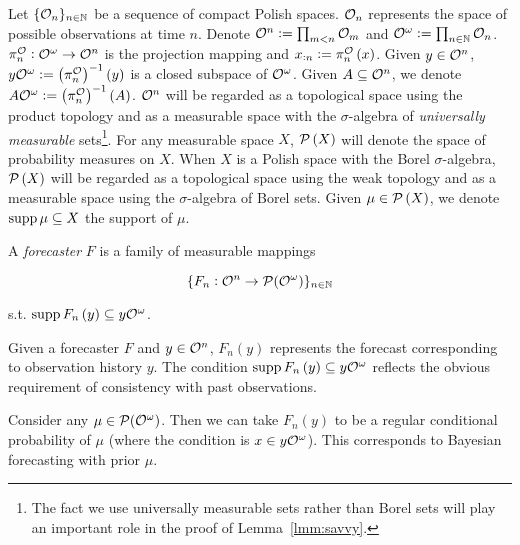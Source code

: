 Let $\{\mathcal{O}_n\}_{n \in \mathbb{N}}$ be a sequence of compact Polish spaces. $\mathcal{O}_n$ represents the space of possible observations at time $n$. Denote $\mathcal{O}^n := \prod_{m < n} \mathcal{O}_m$  and $\mathcal{O}^\omega:=\prod_{n \in \mathbb{N}} \mathcal{O}_n$. $\pi^{\mathcal{O}}_n: \mathcal{O}^\omega \rightarrow \mathcal{O}^n$ is the projection mapping and $x_{:n}:=\pi^{\mathcal{O}}_n\left(x\right)$. Given $y \in \mathcal{O}^n$, $y\mathcal{O}^\omega := \left(\pi^{\mathcal{O}}_n\right)^{-1}\left(y\right)$ is a closed subspace of $\mathcal{O}^\omega$. Given $A\subseteq\mathcal{O}^n$, we denote $A\mathcal{O}^\omega:=\left(\pi^{\mathcal{O}}_n\right)^{-1}(A)$. $\mathcal{O}^n$ will be regarded as a topological space using the product topology and as a measurable space with the $\sigma$-algebra of \emph{universally measurable} sets\footnote{The fact we use universally measurable sets rather than Borel sets will play an important role in the proof of Lemma~\ref{lmm:savvy}.}. For any measurable space $X$, $\mathcal{P}\left(X\right)$ will denote the space of probability measures on $X$. When $X$ is a Polish space with the Borel $\sigma$-algebra, $\mathcal{P}\left(X\right)$ will be regarded as a topological space using the weak topology and as a measurable space using the $\sigma$-algebra of Borel sets. Given $\mu \in \mathcal{P}\left(X\right)$, we denote $\operatorname{supp} \mu \subseteq X$ the support of $\mu$.

\begin{samepage}
\begin{definition}

A \emph{forecaster} $F$ is a family of measurable mappings

\[\{F_n: \mathcal{O}^n \rightarrow \mathcal{P}(\mathcal{O}^\omega)\}_{n \in \mathbb{N}}\]

s.t. $\operatorname{supp} {F_n\left(y\right)} \subseteq y\mathcal{O}^\omega$.

\end{definition}
\end{samepage}

Given a forecaster $F$ and $y \in \mathcal{O}^n$, $F_n\left(y\right)$ represents the forecast corresponding to observation history $y$. The condition $\operatorname{supp} {F_n\left(y\right)} \subseteq y\mathcal{O}^\omega$ reflects the obvious requirement of consistency with past observations.

\begin{samepage}
\begin{example}

Consider any $\mu\in\mathcal{P}(\mathcal{O}^\omega)$. Then we can take $F_n(y)$ to be a regular conditional probability of $\mu$ (where the condition is $x \in y\mathcal{O}^\omega$). This corresponds to Bayesian forecasting with prior $\mu$.

\end{example}
\end{samepage}

